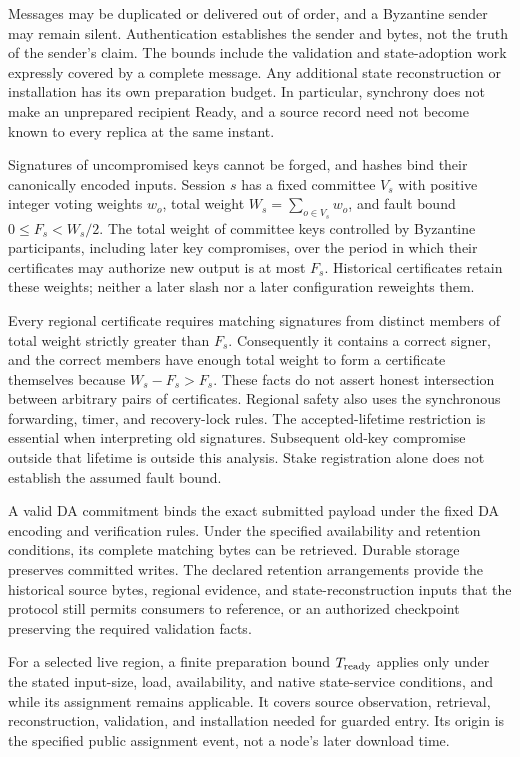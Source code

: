 Messages may be duplicated or delivered out of order, and a Byzantine
sender may remain silent.  Authentication establishes the sender and
bytes, not the truth of the sender's claim.  The bounds include the
validation and state-adoption work expressly covered by a complete
message.  Any additional state reconstruction or installation has its
own preparation budget.  In particular, synchrony does not make an
unprepared recipient Ready, and a source record need not become known
to every replica at the same instant.

\begin{assumption}
\label{ass:regional-faults}
Signatures of uncompromised keys cannot be forged, and hashes bind their
canonically encoded inputs.  Session $s$ has a fixed committee $V_s$
with positive integer voting weights $w_o$, total weight
$W_s=\sum_{o\in V_s}w_o$, and fault bound $0\le F_s<W_s/2$.  The total weight
of committee keys controlled by Byzantine participants, including later
key compromises, over the period in which their
certificates may authorize new output is at most $F_s$.  Historical
certificates retain these weights; neither a later slash nor a later
configuration reweights them.
\end{assumption}

Every regional certificate requires matching signatures from distinct
members of total weight strictly greater than $F_s$.  Consequently it
contains a correct signer, and the correct members have enough total
weight to form a certificate themselves because $W_s-F_s>F_s$.
These facts do not assert honest intersection between arbitrary pairs
of certificates.  Regional safety also uses the synchronous forwarding,
timer, and recovery-lock rules.  The accepted-lifetime restriction is
essential when interpreting old signatures.  Subsequent old-key
compromise outside that lifetime is outside this analysis.  Stake
registration alone does not establish the assumed fault bound.

\begin{assumption}
\label{ass:data-state}
A valid DA commitment binds the exact submitted payload under the fixed
DA encoding and verification rules.  Under the specified availability
and retention conditions, its complete matching bytes can be
retrieved.  Durable storage preserves committed writes.  The declared
retention arrangements provide the historical source bytes, regional
evidence, and state-reconstruction inputs that the protocol still
permits consumers to reference, or an authorized checkpoint preserving
the required validation facts.

For a selected live region, a finite preparation bound
$T_{\rm ready}$ applies only under the stated input-size, load,
availability, and native state-service conditions, and while its
assignment remains applicable.  It covers source observation, retrieval,
reconstruction, validation, and installation needed for guarded entry.
Its origin is the specified public assignment event, not a node's later
download time.
\end{assumption}

